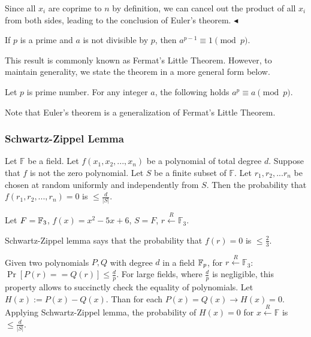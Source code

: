 \documentclass[../lecture-notes.tex]{subfiles}
\begin{document}
Since all $x_i$ are coprime to $n$ by definition, we can cancel out the product
of all $x_i$ from both sides, leading to the conclusion of Euler's theorem.
$\blacktriangleleft$

\begin{corollary} \label{cor:fermat_little_theorem}
    If $p$ is a prime and $a$ is not divisible by $p$, then $a^{p - 1} \equiv 1 \pmod{p}$.
\end{corollary}
This result is commonly known as Fermat's Little Theorem. However, to maintain generality, 
we state the theorem in a more general form below.

\begin{theorem}  \label{th:fermat_little_theorem}
    Let $p$ is prime number. For any integer $a$, the following holds $a^{p} \equiv a \pmod{p}$.
\end{theorem}

Note that Euler's theorem is a generalization of Fermat's Little Theorem.

\subsubsection{Schwartz-Zippel Lemma}

\begin{lemma}\label{lemma:sz}
Let $\mathbb{F}$ be a field. Let $f(x_1, x_2, ..., x_n)$ be a polynomial of total degree $d$. Suppose that $f$ is not the zero polynomial. Let $S$ be
a finite subset of $\mathbb{F}$. Let $r_1, r_2, ... r_n$ be chosen at random uniformly and independently from $S$. Then the probability that 
$f(r_1, r_2, ..., r_n) = 0$ is $\le \frac{d}{|S|}$.
\end{lemma}

\begin{example}
Let $F = \mathbb{F}_3$, $f(x) = x^2 - 5x + 6$, $S = F$, $r \xleftarrow{R} \mathbb{F}_3$.

Schwartz-Zippel lemma says that the probability that $f(r) = 0$ is $\le \frac{2}{3}$.
\end{example}

\vspace{-0.5em}

Given two polynomials $P, Q$ with  degree $d$ in a field $\mathbb{F}_p$, for $r \xleftarrow{R} \mathbb{F}_3$: $\Pr[P(r) == Q(r)] \le \frac{d}{p}$.
For large fields, where  $\frac{d}{p}$ is negligible, this property allows to succinctly check the equality of polynomials.
Let $H(x) := P(x) - Q(x)$. Than for each $P(x) = Q(x) \rightarrow H(x) = 0$. Applying Schwartz-Zippel lemma, 
the probability of $H(x) = 0$ for $x \xleftarrow{R} \mathbb{F} $ is $\le \frac{d}{|S|}$.
\end{document}

